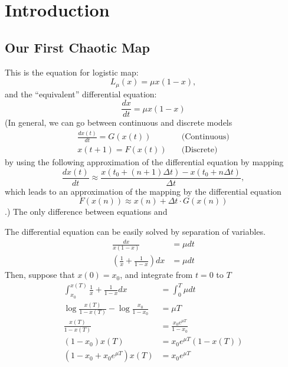 \documentclass[11pt]{article}
\begin{document}
\section{Introduction}
\subsection{Our First Chaotic Map}
This is the equation for logistic map:
\begin{equation}
  L_{\mu}(x) = \mu x(1-x),
  \label{logistic}
\end{equation}
and the ``equivalent'' differential equation:
\begin{equation}
  \frac{dx}{dt} = \mu x(1-x)
  \label{logisticdiffeq}
\end{equation}
(In general, we can go between continuous and discrete models
\begin{align*}
  \frac{dx(t)}{dt} = G(x(t)) &\quad\mbox{(Continuous)} \\
  x(t + 1) = F(x(t)) &\quad\mbox{(Discrete)}
\end{align*}
by using the following approximation of the differential equation by mapping
\begin{equation*}
  \frac{dx(t)}{dt} \approx \frac{x(t_0 + (n+1)\Delta t) - x(t_0 + n \Delta t)}{\Delta t},
\end{equation*}
which leads to an approximation of the mapping by the differential equation
\begin{equation*}
  F(x(n)) \approx x(n) + \Delta t \cdot G(x(n))
\end{equation*}
.)
The only difference between equations  and 

The differential equation  can be easily solved by separation of variables.
\begin{align*}
  \frac{dx}{x(1-x)} &= \mu dt \\  
  \left( \frac{1}{x} + \frac{1}{1-x} \right) dx &= \mu dt
\end{align*}
Then, suppose that $x(0) = x_0$, and integrate from $t = 0$ to $T$
\begin{align*}
  \int_{x_0}^{x(T)} \frac{1}{x} + \frac{1}{1-x} dx &= \int_0^T \mu dt \\
  \log{\frac{x(T)}{1-x(T)}} - \log{\frac{x_0}{1-x_0}} &= \mu T \\
  \frac{x(T)}{1-x(T)} &= \frac{x_0 e^{\mu T}}{1-x_0} \\
  (1-x_0)x(T) &= x_0 e^{\mu T} (1-x(T)) \\
  (1-x_0 + x_0 e^{\mu T})x(T) &= x_0 e^{\mu T}
\end{align*}
\end{document}
